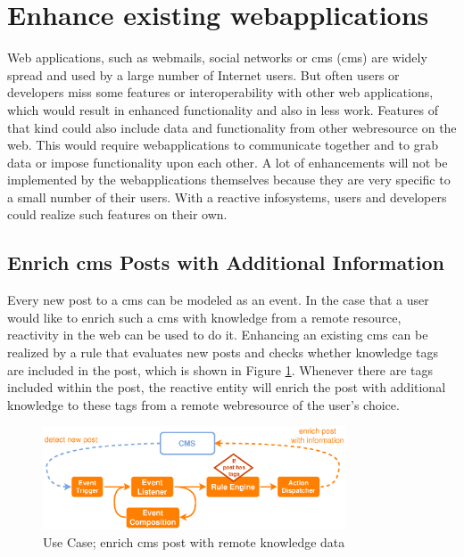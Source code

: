 \section{Enhance existing \glspl{webapplication}}
Web applications, such as webmails, social networks or \textrm{\acrlong{cms} (\acrshort{cms})} are widely spread and used by a large number of Internet users.
But often users or developers miss some features or interoperability with other web applications, which would result in enhanced functionality and also in less work.
Features of that kind could also include data and functionality from other \textrm{\gls{webresource}} on the web.
This would require \textrm{\glspl{webapplication}} to communicate together and to grab data or impose functionality upon each other.
A lot of enhancements will not be implemented by the \textrm{\glspl{webapplication}} themselves because they are very specific to a small number of their users.
With a reactive \textrm{\glspl{infosystem}}, users and developers could realize such features on their own.



\subsection{Enrich \acrlong{cms} Posts with Additional Information}
Every new post to a \textrm{\acrlong{cms}} can be modeled as an event.
In the case that a user would like to enrich such a \textrm{\acrshort{cms}} with knowledge from a remote resource, reactivity in the \textrm{\gls{web}} can be used to do it.
Enhancing an existing \textrm{\acrshort{cms}} can be realized by a rule that evaluates new posts and checks whether knowledge tags are included in the post, which is shown in Figure \ref{fig:ProBinderAnnotations}.
Whenever there are tags included within the post, the reactive entity will enrich the post with additional knowledge to these tags from a remote \textrm{\gls{webresource}} of the user's choice.
\begin{figure}[!ht]
  \centering
  \includegraphics[width=0.8\textwidth]{figures/ProBinderAnnotations}
  \caption{Use Case; enrich \acrshort{cms} post with remote knowledge data}
  \label{fig:ProBinderAnnotations}
\end{figure}



